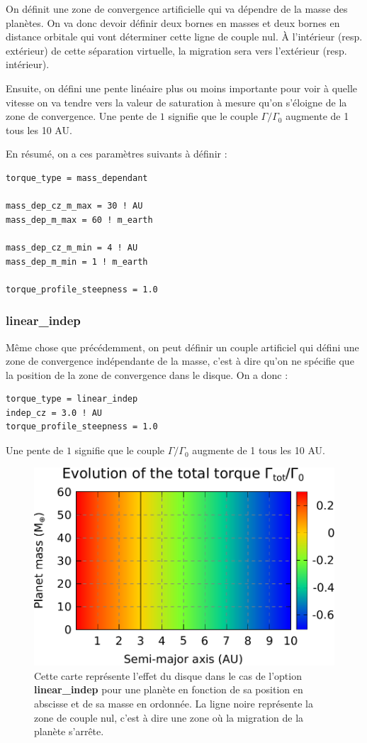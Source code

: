 On définit une zone de convergence artificielle qui va dépendre de la masse des planètes. On va donc devoir définir deux bornes en masses et deux bornes en distance orbitale qui vont déterminer cette ligne de couple nul. À l'intérieur (resp. extérieur) de cette séparation virtuelle, la migration sera vers l'extérieur (resp. intérieur).

Ensuite, on défini une pente linéaire plus ou moins importante pour voir à quelle vitesse on va tendre vers la valeur de saturation à mesure qu'on s'éloigne de la zone de convergence. Une pente de $1$ signifie que le couple $\Gamma/\Gamma_0$ augmente de 1 tous les 10 AU.

En résumé, on a ces paramètres suivants à définir : 
\begin{verbatim}
torque_type = mass_dependant

mass_dep_cz_m_max = 30 ! AU
mass_dep_m_max = 60 ! m_earth

mass_dep_cz_m_min = 4 ! AU
mass_dep_m_min = 1 ! m_earth

torque_profile_steepness = 1.0
\end{verbatim}

\subsubsection{linear\_indep}
Même chose que précédemment, on peut définir un couple artificiel qui défini une zone de convergence indépendante de la masse, c'est à dire qu'on ne spécifie que la position de la zone de convergence dans le disque. On a donc : 
\begin{verbatim}
torque_type = linear_indep
indep_cz = 3.0 ! AU
torque_profile_steepness = 1.0
\end{verbatim}

Une pente de $1$ signifie que le couple $\Gamma/\Gamma_0$ augmente de 1 tous les 10 AU.

\begin{figure}[htb]
\centering
\includegraphics[width=0.65\linewidth]{figure/migration_map/linear_indep.pdf}
\caption{Cette carte représente l'effet du disque dans le cas de l'option \textbf{linear\_indep} pour une planète en fonction de sa position en abscisse et de sa masse en ordonnée. La ligne noire représente la zone de couple nul, c'est à dire une zone où la migration de la planète s'arrête.}
\end{figure}

